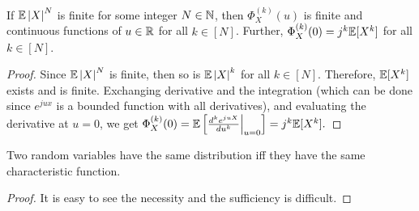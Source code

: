 \documentclass[letterpaper,10pt,english]{article}
\begin{document}
\begin{thm}
If $\mathbb{E}\left\lvert X\right\rvert^N$ is finite for some integer $N \in \mathbb{N}$, 
then $\Phi_X^{(k)}(u)$ is finite and continuous functions of $u \in \mathbb{R}$ for all $k \in [N]$. 
Further, $\Phi_X^{(k)}(0) = j^k\mathbb{E}[X^k]$ for all $k \in [N]$.  
\end{thm}
\begin{proof}
Since $\mathbb{E}\left\lvert X\right\rvert^N$ is finite, then so is $\mathbb{E}\left\lvert X\right\rvert^k$ for all $k\in [N]$. 
Therefore, $\mathbb{E}[X^k]$ exists and is finite. 
Exchanging derivative and the integration (which can be done since $e^{ju x}$ is a bounded function with all derivatives), 
and evaluating the derivative at $u=0$, we get 
$
\Phi_X^{(k)}(0) 
= \mathbb{E}\left[\frac{d^ke^{ju X}}{du^k}\Big\rvert_{u=0}\right]
= j^k\mathbb{E}[X^k].
$
\end{proof}

\begin{thm} 
Two random variables have the same distribution iff they have the same characteristic function. 
\end{thm}
\begin{proof}
It is easy to see the necessity and the sufficiency is difficult. 
\end{proof}

\end{document}
